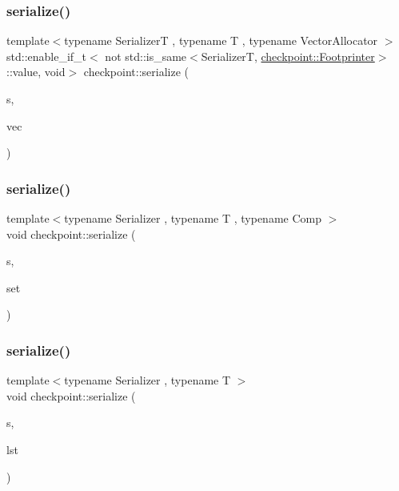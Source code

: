 \subsubsection{\texorpdfstring{serialize()}{serialize()}\hspace{0.1cm}{\footnotesize\ttfamily [19/29]}}
{\footnotesize\ttfamily template$<$typename SerializerT , typename T , typename Vector\+Allocator $>$ \\
std\+::enable\+\_\+if\+\_\+t$<$ not std\+::is\+\_\+same$<$SerializerT, \hyperlink{structcheckpoint_1_1_footprinter}{checkpoint\+::\+Footprinter}$>$\+::value, void$>$ checkpoint\+::serialize (\begin{DoxyParamCaption}\item[{SerializerT \&}]{s,  }\item[{std\+::vector$<$ T, Vector\+Allocator $>$ \&}]{vec }\end{DoxyParamCaption})}

\mbox{\label{namespacecheckpoint_ae032265314cdf8e9155a6bbc423ca1c9}} 
\subsubsection{\texorpdfstring{serialize()}{serialize()}\hspace{0.1cm}{\footnotesize\ttfamily [20/29]}}
{\footnotesize\ttfamily template$<$typename Serializer , typename T , typename Comp $>$ \\
void checkpoint\+::serialize (\begin{DoxyParamCaption}\item[{\hyperlink{structcheckpoint_1_1_serializer}{Serializer} \&}]{s,  }\item[{std\+::multiset$<$ T, Comp $>$ \&}]{set }\end{DoxyParamCaption})\hspace{0.3cm}{\ttfamily [inline]}}

\mbox{\label{namespacecheckpoint_afb32627049eb840e4f8b9fd3022f2eb2}} 
\subsubsection{\texorpdfstring{serialize()}{serialize()}\hspace{0.1cm}{\footnotesize\ttfamily [21/29]}}
{\footnotesize\ttfamily template$<$typename Serializer , typename T $>$ \\
void checkpoint\+::serialize (\begin{DoxyParamCaption}\item[{\hyperlink{structcheckpoint_1_1_serializer}{Serializer} \&}]{s,  }\item[{std\+::list$<$ T $>$ \&}]{lst }\end{DoxyParamCaption})\hspace{0.3cm}{\ttfamily [inline]}}

